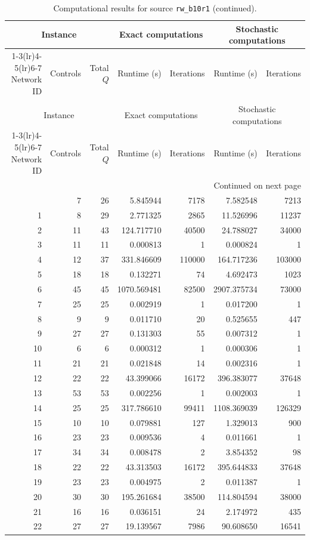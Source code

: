 \documentclass{article}
\begin{document}
\begin{landscape}
\begin{longtable}{rrrrrrr}
\caption{Computational results for source \texttt{rw\_b10r1}.}\\
\toprule
\multicolumn{3}{c}{Instance} & \multicolumn{2}{c}{Exact computations} & \multicolumn{2}{c}{Stochastic computations} \\
\cmidrule(lr){1-3}\cmidrule(lr){4-5}\cmidrule(lr){6-7}
Network ID & Controls & Total $Q$ & Runtime (s) & Iterations & Runtime (s) & Iterations \\
\midrule
\endfirsthead
\caption[]{Computational results for source \texttt{rw\_b10r1} (continued).}\\
\toprule
\multicolumn{3}{c}{Instance} & \multicolumn{2}{c}{Exact computations} & \multicolumn{2}{c}{Stochastic computations} \\
\cmidrule(lr){1-3}\cmidrule(lr){4-5}\cmidrule(lr){6-7}
Network ID & Controls & Total $Q$ & Runtime (s) & Iterations & Runtime (s) & Iterations \\
\midrule
\endhead
\midrule
\multicolumn{7}{r}{Continued on next page} \\
\endfoot
\bottomrule
\endlastfoot
0 & 7 & 26 & 5.845944 & 7178 & 7.582548 & 7213 \\
1 & 8 & 29 & 2.771325 & 2865 & 11.526996 & 11237 \\
2 & 11 & 43 & 124.717710 & 40500 & 24.788027 & 34000 \\
3 & 11 & 11 & 0.000813 & 1 & 0.000824 & 1 \\
4 & 12 & 37 & 331.846609 & 110000 & 164.717236 & 103000 \\
5 & 18 & 18 & 0.132271 & 74 & 4.692473 & 1023 \\
6 & 45 & 45 & 1070.569481 & 82500 & 2907.375734 & 73000 \\
7 & 25 & 25 & 0.002919 & 1 & 0.017200 & 1 \\
8 & 9 & 9 & 0.011710 & 20 & 0.525655 & 447 \\
9 & 27 & 27 & 0.131303 & 55 & 0.007312 & 1 \\
10 & 6 & 6 & 0.000312 & 1 & 0.000306 & 1 \\
11 & 21 & 21 & 0.021848 & 14 & 0.002316 & 1 \\
12 & 22 & 22 & 43.399066 & 16172 & 396.383077 & 37648 \\
13 & 53 & 53 & 0.002256 & 1 & 0.002003 & 1 \\
14 & 25 & 25 & 317.786610 & 99411 & 1108.369039 & 126329 \\
15 & 10 & 10 & 0.079881 & 127 & 1.329013 & 900 \\
16 & 23 & 23 & 0.009536 & 4 & 0.011661 & 1 \\
17 & 34 & 34 & 0.008478 & 2 & 3.854352 & 98 \\
18 & 22 & 22 & 43.313503 & 16172 & 395.644833 & 37648 \\
19 & 23 & 23 & 0.004975 & 2 & 0.011387 & 1 \\
20 & 30 & 30 & 195.261684 & 38500 & 114.804594 & 38000 \\
21 & 16 & 16 & 0.036151 & 24 & 2.174972 & 435 \\
22 & 27 & 27 & 19.139567 & 7986 & 90.608650 & 16541 \\
\end{longtable}


\end{landscape}
\end{document}
